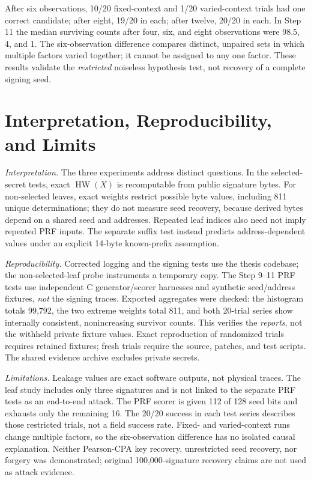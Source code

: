 \documentclass[conference,a4paper,10pt]{IEEEtran}
\begin{document}
After six observations, 10/20 fixed-context and 1/20 varied-context trials had one correct candidate; after eight, 19/20 in each; after twelve, 20/20 in each. In Step 11 the median surviving counts after four, six, and eight observations were 98.5, 4, and 1. The six-observation difference compares distinct, unpaired sets in which multiple factors varied together; it cannot be assigned to any one factor. These results validate the \emph{restricted} noiseless hypothesis test, not recovery of a complete signing seed.

\section{Interpretation, Reproducibility, and Limits}
\emph{Interpretation.} The three experiments address distinct questions. In the selected-secret tests, exact $\operatorname{HW}(X)$ is recomputable from public signature bytes. For non-selected leaves, exact weights restrict possible byte values, including 811 unique determinations; they do not measure seed recovery, because derived bytes depend on a shared seed and addresses. Repeated leaf indices also need not imply repeated PRF inputs. The separate suffix test instead predicts address-dependent values under an explicit 14-byte known-prefix assumption.

\emph{Reproducibility.} Corrected logging and the signing tests use the thesis codebase; the non-selected-leaf probe instruments a temporary copy. The Step 9--11 PRF tests use independent C generator/scorer harnesses and synthetic seed/address fixtures, \emph{not} the signing traces. Exported aggregates were checked: the histogram totals 99,792, the two extreme weights total 811, and both 20-trial series show internally consistent, nonincreasing survivor counts. This verifies the \emph{reports}, not the withheld private fixture values. Exact reproduction of randomized trials requires retained fixtures; fresh trials require the source, patches, and test scripts. The shared evidence archive excludes private secrets.

\emph{Limitations.} Leakage values are exact software outputs, not physical traces. The leaf study includes only three signatures and is not linked to the separate PRF tests as an end-to-end attack. The PRF scorer is given 112 of 128 seed bits and exhausts only the remaining 16. The 20/20 success in each test series describes those restricted trials, not a field success rate. Fixed- and varied-context runs change multiple factors, so the six-observation difference has no isolated causal explanation. Neither Pearson-CPA key recovery, unrestricted seed recovery, nor forgery was demonstrated; original 100,000-signature recovery claims are not used as attack evidence.
\end{document}
